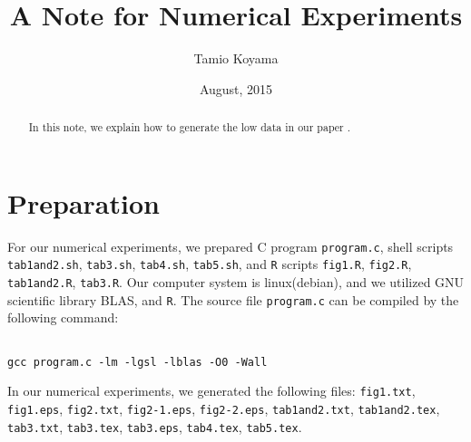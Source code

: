 \documentclass{article}
\title{A Note for Numerical Experiments}
\author{Tamio Koyama}
\date{August, 2015}
\begin{document}
\maketitle

\begin{abstract}
In this note, we explain how to generate the low data in our paper
\cite{koyama-takemura2}.
\end{abstract}

\section{Preparation}
For our numerical experiments, we prepared C program {\tt program.c}, 
shell scripts 
{\tt tab1and2.sh}, {\tt tab3.sh}, {\tt tab4.sh}, {\tt tab5.sh},
and {\tt R} scripts 
{\tt fig1.R}, {\tt fig2.R}, {\tt tab1and2.R}, {\tt tab3.R}.
Our computer system is linux(debian), and we utilized GNU scientific library
BLAS, and {\tt R}.
The source file {\tt program.c} can be compiled by the following command:
\begin{lstlisting}[style=BashInputStyle]

gcc program.c -lm -lgsl -lblas -O0 -Wall 
\end{lstlisting}

 
In our numerical experiments, we generated the following files:
{\tt fig1.txt}, {\tt fig1.eps},
{\tt fig2.txt}, {\tt fig2-1.eps}, {\tt fig2-2.eps},
{\tt tab1and2.txt}, {\tt tab1and2.tex},
{\tt tab3.txt}, {\tt tab3.tex}, {\tt tab3.eps},
{\tt tab4.tex}, {\tt tab5.tex}.
\end{document}
